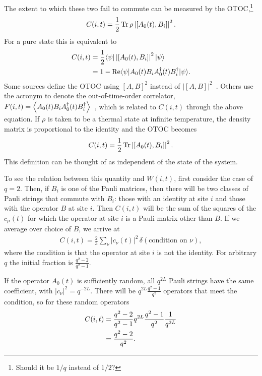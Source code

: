 The extent to which these two fail to commute can be measured by the OTOC,\footnote{Should it be $1/q$ instead of $1/2$?}
\begin{align}
C(i,t) = \frac{1}{2}\operatorname{Tr} \rho \left|[A_0(t),B_i]\right|^2.\nonumber
\end{align}
For a pure state this is equivalent to~\cite{Keyserlingk, Jonay}
\begin{align}
C(i,t) &= \frac{1}{2}\langle\psi|\left|[A_0(t),B_i]\right|^2|\psi\rangle\nonumber\\
&= 1-\operatorname{Re}\langle\psi|A_0(t)B_iA_0^\dag(t)B_i^\dag|\psi\rangle. \nonumber
\end{align}
Some sources define the OTOC using $[A,B]^2$ instead of $|[A,B]|^2$~\cite{Jonay, Roberts2016, Nahum2017}. Others use the acronym to denote the out-of-time-order correlator, $F(i,t) = \left\langle A_0(t)B_iA_0^\dag(t)B^\dag_i \right\rangle$~\cite{Who}, which is related to $C(i,t)$ through the above equation. If $\rho$ is taken to be a thermal state at infinite temperature, the density matrix is proportional to the identity and the OTOC becomes
\begin{align}
C(i,t) = \frac{1}{2}\operatorname{Tr} \left|[A_0(t),B_i]\right|^2.
\end{align}
This definition can be thought of as independent of the state of the system.

To see the relation between this quantity and $W(i,t)$, first consider the case of $q=2$. Then, if $B_i$ is one of the Pauli matrices, then there will be two classes of Pauli strings that commute with $B_i$: those with an identity at site $i$ and those with the operator $B$ at site $i$. Then $C(i,t)$ will be the sum of the squares of the $c_\mu(t)$ for which the operator at site $i$ is a Pauli matrix other than $B$. If we average over choice of $B$, we arrive at 
\begin{align}
C(i,t) = \frac{2}{3}\sum_\nu|c_\nu(t)|^2\,\delta(\text{condition on $\nu$}),
	\label{eqn:otoc}
\end{align}
where the condition is that the operator at site $i$ is not the identity. For arbitrary $q$ the initial fraction is $\frac{q^2-2}{q^2-1}$. 

If the operator $A_0(t)$ is sufficiently random, all $q^{2L}$ Pauli strings have the same coefficient, with $|c_\nu|^2 = q^{-2L}$. There will be $q^{2L}\frac{q^2-1}{q^2}$ operators that meet the condition, so for these random operators
\begin{align}
C(i,t) &= \frac{q^2-2}{q^2-1}q^{2L}\frac{q^2-1}{q^2}\frac{1}{q^{2L}}\nonumber\\
&= \frac{q^2-2}{q^2}\nonumber.
\end{align}

